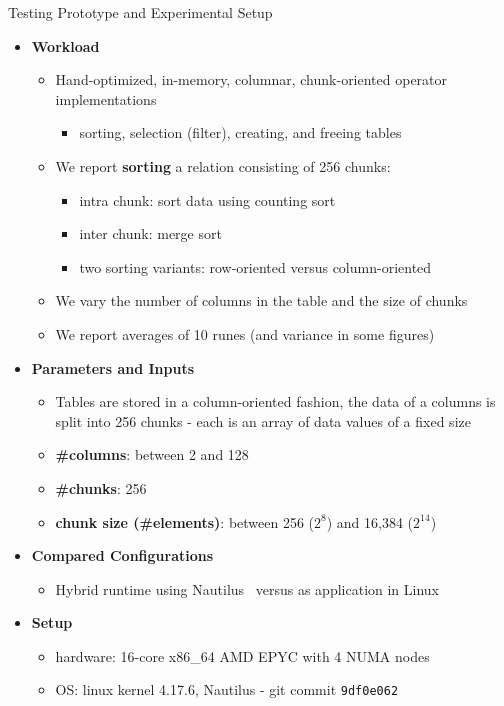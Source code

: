 \begin{block}{Testing Prototype and Experimental Setup}
  \begin{itemize}
    \item \textbf{Workload}
      \begin{itemize}
      \item Hand-optimized, in-memory, columnar, chunk-oriented operator
        implementations
    \begin{itemize}
    \item sorting, selection (filter), creating, and freeing tables
      \end{itemize}
  \item We report \textbf{sorting} a relation consisting of 256 chunks:
    \begin{itemize}
    \item intra chunk: sort data using counting sort
    \item inter chunk: merge sort
    \item two sorting variants: row-oriented versus column-oriented
\end{itemize}
\item We vary the number of columns in the table and the size of chunks
\item We report averages of 10 runes (and variance in some figures)
  \end{itemize}
\item \textbf{Parameters and Inputs}
  \begin{itemize}
  \item Tables are stored in a column-oriented fashion, the data of a columns is split into 256 chunks - each is an array of data values of a fixed size 
  \item \textbf{\#columns}: between 2 and 128
  \item \textbf{\#chunks}: 256
  \item \textbf{chunk size (\#elements)}: between 256 ($2^8$) and 16,384 ($2^{14}$)
  \end{itemize}
\item \textbf{Compared Configurations}
    \begin{itemize}
    \item Hybrid runtime using Nautilus~\cite{HALE:2015:NAUTILUS} versus as application in Linux 
    \end{itemize}
  \item \textbf{Setup}
    \begin{itemize}
    \item hardware: 16-core x86\_64 AMD EPYC with 4 NUMA nodes
    \item OS: linux kernel 4.17.6, Nautilus - git commit \texttt{9df0e062}
    \end{itemize}
  \end{itemize}
\end{block}
